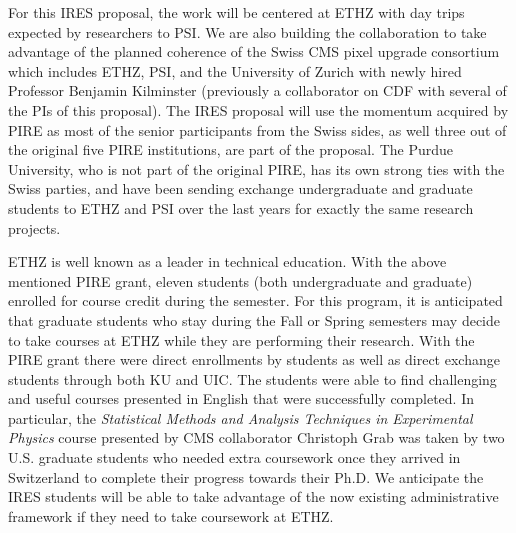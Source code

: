 For this IRES proposal, the work will be centered at ETHZ with day
trips expected by researchers to PSI. We are also building the
collaboration to take advantage of the planned coherence of the Swiss
CMS pixel upgrade consortium which includes ETHZ, PSI, and the
University of Zurich with newly hired Professor Benjamin Kilminster
(previously a collaborator on CDF with several of the PIs of this
proposal). The IRES proposal will use the momentum acquired by PIRE as
most of the senior participants from the Swiss sides, as well three out
of the original five PIRE institutions, are part of the proposal. The
Purdue University, who is not part of the original PIRE, has its own
strong ties with the Swiss parties, and have been sending exchange
undergraduate and graduate students to ETHZ and PSI over the last
years for exactly the same research projects.

ETHZ is well known as a leader in technical education.  With the above
mentioned PIRE grant, eleven students (both undergraduate and
graduate) enrolled for course credit during the semester.  For this
program, it is anticipated that graduate students who stay during the
Fall or Spring semesters may decide to take courses at ETHZ while they
are performing their research.  With the PIRE grant there were direct
enrollments by students as well as direct exchange students through
both KU and UIC.  The students were able to find challenging and
useful courses presented in English that were successfully completed.
In particular, the {\it Statistical Methods and Analysis Techniques in
  Experimental Physics} course presented by CMS collaborator Christoph
Grab was taken by two U.S. graduate students who needed extra
coursework once they arrived in Switzerland to complete their progress
towards their Ph.D.  We anticipate the IRES students will be able to
take advantage of the now existing administrative framework if they
need to take coursework at ETHZ.
